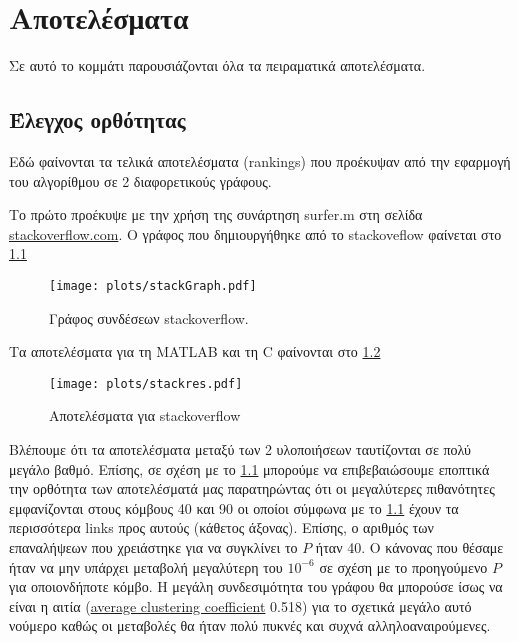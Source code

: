 \chapter{Αποτελέσματα}
Σε αυτό το κομμάτι παρουσιάζονται όλα τα πειραματικά αποτελέσματα.
\section{Έλεγχος ορθότητας}
Εδώ φαίνονται τα τελικά αποτελέσματα (rankings) που προέκυψαν από την εφαρμογή του αλγορίθμου σε 2 διαφορετικούς γράφους.

Το πρώτο προέκυψε με την χρήση της συνάρτηση surfer.m στη σελίδα \href{http://stackoverflow.com/}{stackoverflow.com}.
O γράφος που δημιουργήθηκε από το stackoveflow φαίνεται στο
\hyperref[fig:stackGraph]{\figurename{} \ref{fig:stackGraph}}
\begin{figure}[h]
	\centerline{\texttt{[image: plots/stackGraph.pdf]}}
	\caption{Γράφος συνδέσεων stackoverflow.}
	\label{fig:stackGraph}
\end{figure}
 
Τα αποτελέσματα για τη MATLAB και τη C φαίνονται στο \hyperref[fig:stackres]{\figurename{} \ref{fig:stackres}}
\begin{figure}[h]
	\centerline{\texttt{[image: plots/stackres.pdf]}}
	\caption{Αποτελέσματα για stackoverflow}
	\label{fig:stackres}
\end{figure}
 
Βλέπουμε ότι τα αποτελέσματα μεταξύ των 2 υλοποιήσεων ταυτίζονται σε πολύ μεγάλο βαθμό.
Επίσης, σε σχέση με το
\hyperref[fig:stackGraph]{\figurename{} \ref{fig:stackGraph}}
μπορούμε να επιβεβαιώσουμε  εποπτικά την ορθότητα των αποτελέσματά μας
παρατηρώντας ότι οι μεγαλύτερες πιθανότητες εμφανίζονται στους κόμβους 40 και 90
οι οποίοι  σύμφωνα με το 
\hyperref[fig:stackGraph]{\figurename{} \ref{fig:stackGraph}}
έχουν τα περισσότερα links προς αυτούς (κάθετος άξονας).
Επίσης, ο αριθμός των επαναλήψεων που χρειάστηκε για να συγκλίνει το $P$ ήταν 40.
Ο κάνονας που θέσαμε ήταν να μην υπάρχει μεταβολή μεγαλύτερη του $10^{-6}$ σε σχέση με το προηγούμενο $P$ για οποιονδήποτε κόμβο.
Η μεγάλη συνδεσιμότητα του γράφου θα μπορούσε ίσως να είναι η αιτία 
(\href{https://en.wikipedia.org/wiki/Clustering_coefficient#Global_clustering_coefficient}{average clustering coefficient} 0.518)
για  το σχετικά μεγάλο αυτό νούμερο καθώς οι μεταβολές θα ήταν πολύ πυκνές και συχνά αλληλοαναιρούμενες.

\newpage

